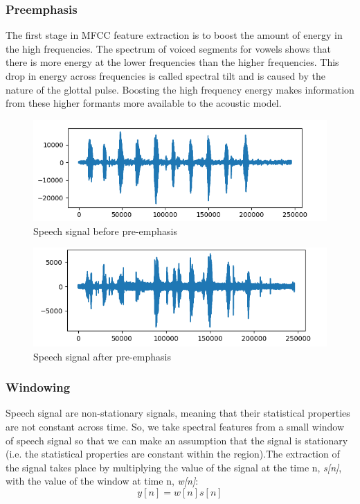 \subsubsection{Preemphasis}
The first stage in MFCC feature extraction is to boost the amount of energy in the high frequencies. The spectrum of voiced segments for vowels shows that there is more energy at the lower frequencies than the higher frequencies. This drop in energy across frequencies is called spectral tilt and is caused by the nature of the glottal pulse. Boosting the high frequency energy makes information from these higher formants more available to the acoustic model.
\begin{figure}[h]
	\centerline{\includegraphics[scale=0.50]{images/beforepreemphasis.png}}
	\caption{Speech signal before pre-emphasis}
\end{figure}

\begin{figure}[h]
	\centerline{\includegraphics[scale=0.50]{images/afterpreemphasis.png}}
	\caption{Speech signal after pre-emphasis}
\end{figure}

\subsubsection{Windowing}
Speech signal are non-stationary signals, meaning that their statistical properties are not constant across time. So, we take spectral features from a small window of speech signal so that we can make an assumption that the signal is stationary (i.e. the statistical properties are constant within the region).The extraction of the signal takes place by multiplying the value of the signal at the time n, \textit{s[n]}, with the value of the window at time n, \textit{w[n]}:
\begin{equation}
y[n] = w[n]s[n]
\end{equation}

